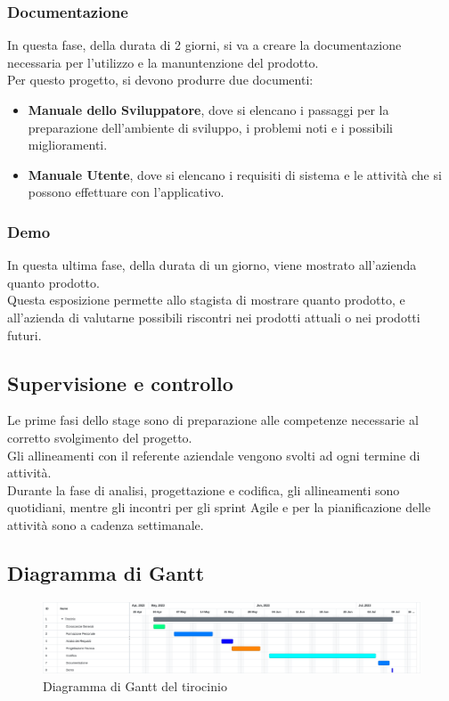 \subsubsection{Documentazione}
In questa fase, della durata di 2 giorni, si va a creare la documentazione necessaria per l'utilizzo e la manuntenzione del prodotto.\\
Per questo progetto, si devono produrre due documenti:
\begin{itemize}
    \item \textbf{Manuale dello Sviluppatore}, dove si elencano i passaggi per la preparazione dell'ambiente di sviluppo, i problemi noti e i possibili miglioramenti.
    \item \textbf{Manuale Utente}, dove si elencano i requisiti di sistema e le attività che si possono effettuare con l'applicativo.
\end{itemize}
\subsubsection{Demo}
In questa ultima fase, della durata di un giorno, viene mostrato all'azienda quanto prodotto.\\
Questa esposizione permette allo stagista di mostrare quanto prodotto, e all'azienda di valutarne possibili riscontri nei prodotti attuali o nei prodotti futuri.

\subsection{Supervisione e controllo}
Le prime fasi dello stage sono di preparazione alle competenze necessarie al corretto svolgimento
del progetto.\\
Gli allineamenti con il referente aziendale vengono svolti ad ogni termine di attività.\\
Durante la fase di analisi, progettazione e codifica, gli allineamenti sono quotidiani, mentre gli incontri per gli sprint Agile e per la pianificazione delle attività
sono a cadenza settimanale.
\subsection{Diagramma di Gantt}
\begin{figure}[!h] 
    \centering 
    \includegraphics[width=350pt]{images/diagrammaGantt.png} 
    \caption{Diagramma di Gantt del tirocinio}
\end{figure}
